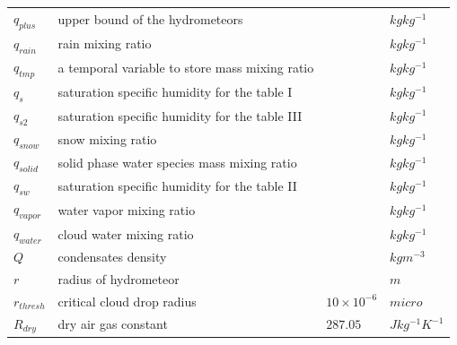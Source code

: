 \documentclass[letterpaper,titlepage,10pt]{article}
\numberwithin{equation}{section}
\begin{document}
\begin{appendices}
\begin{longtable}{p{}p{}p{}p{}}
	$q_{plus}$         & upper bound of the hydrometeors                                                      &                            & $kg kg^{-1}$ \\
	$q_{rain}$         & rain mixing ratio                                                                    &                            & $kg kg^{-1}$ \\
	$q_{tmp}$          & a temporal variable to store mass mixing ratio                                       &                            & $kg kg^{-1}$ \\
	$q_s$              & saturation specific humidity for the table I                                         &                            & $kg kg^{-1}$ \\
	$q_{s2}$           & saturation specific humidity for the table III                                       &                            & $kg kg^{-1}$ \\
	$q_{snow}$         & snow mixing ratio                                                                    &                            & $kg kg^{-1}$ \\
	$q_{solid}$        & solid phase water species mass mixing ratio                                          &                            & $kg kg^{-1}$ \\
	$q_{sw}$           & saturation specific humidity for the table II                                        &                            & $kg kg^{-1}$ \\
	$q_{vapor}$        & water vapor mixing ratio                                                             &                            & $kg kg^{-1}$ \\
	$q_{water}$        & cloud water mixing ratio                                                             &                            & $kg kg^{-1}$ \\
	$Q$                & condensates density                                                                  &                            & $kg m^{-3}$ \\
	$r$                & radius of hydrometeor                                                                &                            & $m$ \\
	$r_{thresh}$       & critical cloud drop radius                                                           & $10 \times 10^{-6}$        & $micro$ \\
	$R_{dry}$          & dry air gas constant                                                                 & $287.05$                   & $J kg^{-1} K^{-1}$ \\

\end{longtable}
\end{appendices}
\end{document}
